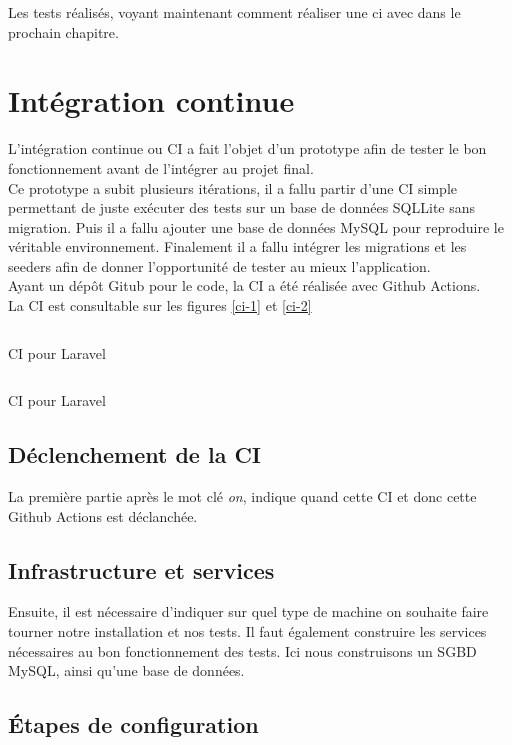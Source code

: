 \documentclass[
    iai, %
    il, %
]{heig-tb}
\begin{document}
Les tests réalisés, voyant maintenant comment réaliser une \Gls{ci} avec dans le prochain chapitre.

\chapter{Intégration continue}
L'intégration continue ou CI a fait l'objet d'un prototype afin de tester le bon fonctionnement
avant de l'intégrer au projet final.\\
Ce prototype a subit plusieurs itérations, il a fallu partir d'une CI simple permettant de juste
exécuter des tests sur un base de données SQLLite sans migration. Puis il a fallu ajouter une base
de données MySQL pour reproduire le véritable environnement. Finalement il a fallu intégrer les
migrations et les seeders afin de donner l'opportunité de tester au mieux l'application.\\
Ayant un dépôt Gitub pour le code, la CI a été réalisée avec Github Actions.\\
La CI est consultable sur les figures \ref{ci-1} et \ref{ci-2}

\begin{listing}[h]
    \inputminted{yaml}{assets/code/ci-1.yml}
    \caption{CI pour Laravel \label{ci-1}}
\end{listing}

\begin{listing}[h]
    \inputminted{yaml}{assets/code/ci-2.yml}
    \caption{CI pour Laravel \label{ci-2}}
\end{listing}

\section{Déclenchement de la CI}
La première partie après le mot clé \emph{on}, indique quand cette CI et donc cette Github Actions est
déclanchée.\\

\section{Infrastructure et services}
Ensuite, il est nécessaire d'indiquer sur quel type de machine on souhaite faire tourner notre
installation et nos tests. Il faut également construire les services nécessaires au bon
fonctionnement des tests. Ici nous construisons un SGBD MySQL, ainsi qu'une base de données.\\

\section{Étapes de configuration}
\end{document}
